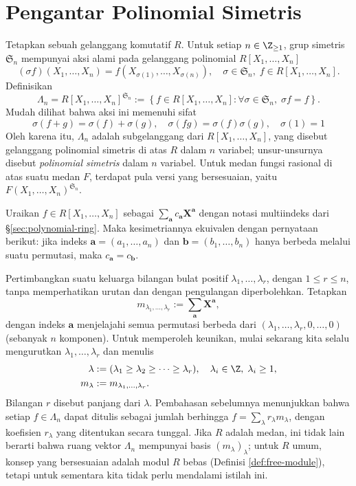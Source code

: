 \section{Pengantar Polinomial Simetris}\label{sec:symmetric-poly}
Tetapkan sebuah gelanggang komutatif $R$. Untuk setiap $n \in \Z_{\geq 1}$, grup simetris $\mathfrak{S}_n$ mempunyai aksi alami pada gelanggang polinomial $R[X_1, \ldots, X_n]$
\[ (\sigma f)(X_1, \ldots, X_n) = f(X_{\sigma(1)}, \ldots, X_{\sigma(n)}), \quad \sigma \in \mathfrak{S}_n, \; f \in R[X_1, \ldots, X_n]. \]
Definisikan
\[ \Lambda_n = R[X_1, \ldots, X_n]^{\mathfrak{S}_n} := \left\{ f \in R[X_1, \ldots, X_n] : \forall \sigma \in \mathfrak{S}_n, \; \sigma f = f \right\}. \]
Mudah dilihat bahwa aksi ini memenuhi sifat
\[ \sigma(f + g) = \sigma(f) + \sigma(g), \quad \sigma(fg) = \sigma(f) \sigma(g), \quad \sigma(1)=1 \]
Oleh karena itu, $\Lambda_n$ adalah subgelanggang dari $R[X_1, \ldots, X_n]$, yang disebut gelanggang polinomial simetris di atas $R$ dalam $n$ variabel; unsur-unsurnya disebut \emph{polinomial simetris} dalam $n$ variabel. Untuk medan fungsi rasional di atas suatu medan $F$, terdapat pula versi yang bersesuaian, yaitu $F(X_1, \ldots, X_n)^{\mathfrak{S}_n}$.

Uraikan $f \in R[X_1, \ldots, X_n]$ sebagai $\sum_{\bm{a}} c_{\bm{a}} \bm{X}^{\bm{a}}$ dengan notasi multiindeks dari \S\ref{sec:polynomial-ring}. Maka kesimetriannya ekuivalen dengan pernyataan berikut: jika indeks $\bm{a} = (a_1, \ldots, a_n)$ dan $\bm{b} = (b_1, \ldots, b_n)$ hanya berbeda melalui suatu permutasi, maka $c_{\bm{a}} = c_{\bm{b}}$.

Pertimbangkan suatu keluarga bilangan bulat positif $\lambda_1, \ldots, \lambda_r$, dengan $1 \leq r \leq n$, tanpa memperhatikan urutan dan dengan pengulangan diperbolehkan. Tetapkan
\[ m_{\lambda_1, \ldots, \lambda_r} := \sum_{\bm{a}} \bm{X}^{\bm{a}}, \]
dengan indeks $\bm{a}$ menjelajahi semua permutasi berbeda dari $(\lambda_1, \ldots, \lambda_r, 0, \ldots, 0)$ (sebanyak $n$ komponen). Untuk memperoleh keunikan, mulai sekarang kita selalu mengurutkan $\lambda_1, \ldots, \lambda_r$ dan menulis
\begin{align*}
	\lambda & := (\lambda_1 \geq \lambda_2 \geq \cdots \geq \lambda_r), \quad \lambda_i \in \Z, \; \lambda_i \geq 1, \\
	m_\lambda & := m_{\lambda_1, \ldots, \lambda_r}.
\end{align*}
Bilangan $r$ disebut panjang dari $\lambda$. Pembahasan sebelumnya menunjukkan bahwa setiap $f \in \Lambda_n$ dapat ditulis sebagai jumlah berhingga $f = \sum_\lambda r_\lambda m_\lambda$, dengan koefisien $r_\lambda$ yang ditentukan secara tunggal. Jika $R$ adalah medan, ini tidak lain berarti bahwa ruang vektor $\Lambda_n$ mempunyai basis $(m_\lambda)_\lambda$; untuk $R$ umum, konsep yang bersesuaian adalah modul $R$ bebas (Definisi \ref{def:free-module}), tetapi untuk sementara kita tidak perlu mendalami istilah ini.

